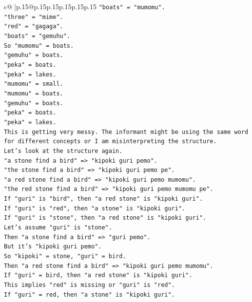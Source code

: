 \documentclass{article}
\begin{document}
{\begin{supertabular}{c@{$\;$}|p{.15\linewidth}@{}p{.15\linewidth}p{.15\linewidth}p{.15\linewidth}p{.15\linewidth}p{.15\linewidth}}
{{{\texttt{"boats" = "mumomu".} \\
\texttt{"three" = "mime".} \\
\texttt{"red" = "gagaga".} \\
\texttt{"boats" = "gemuhu".} \\
\texttt{So "mumomu" = boats.} \\
\texttt{"gemuhu" = boats.} \\
\texttt{"peka" = boats.} \\
\texttt{"peka" = lakes.} \\
\texttt{"mumomu" = small.} \\
\texttt{"mumomu" = boats.} \\
\texttt{"gemuhu" = boats.} \\
\texttt{"peka" = boats.} \\
\texttt{"peka" = lakes.} \\
\texttt{This is getting very messy. The informant might be using the same word for different concepts or I am misinterpreting the structure.} \\
\texttt{Let's look at the structure again.} \\
\texttt{"a stone find a bird" => "kipoki guri pemo".} \\
\texttt{"the stone find a bird" => "kipoki guri pemo pe".} \\
\texttt{"a red stone find a bird" => "kipoki guri pemo mumomu".} \\
\texttt{"the red stone find a bird" => "kipoki guri pemo mumomu pe".} \\
\texttt{If "guri" is "bird", then "a red stone" is "kipoki guri".} \\
\texttt{If "guri" is "red", then "a stone" is "kipoki guri".} \\
\texttt{If "guri" is "stone", then "a red stone" is "kipoki guri".} \\
\texttt{Let's assume "guri" is "stone".} \\
\texttt{Then "a stone find a bird" => "guri pemo".} \\
\texttt{But it's "kipoki guri pemo".} \\
\texttt{So "kipoki" = stone, "guri" = bird.} \\
\texttt{Then "a red stone find a bird" => "kipoki guri pemo mumomu".} \\
\texttt{If "guri" = bird, then "a red stone" is "kipoki guri".} \\
\texttt{This implies "red" is missing or "guri" is "red".} \\
\texttt{If "guri" = red, then "a stone" is "kipoki guri".} \\
}}}
\end{supertabular}}
\end{document}
